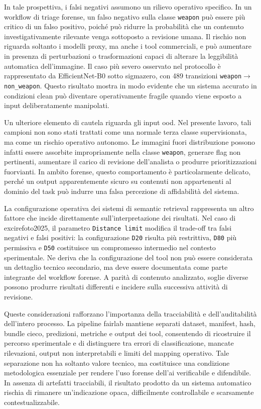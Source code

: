 In tale prospettiva, i falsi negativi assumono un rilievo operativo specifico.
In un workflow di triage forense, un falso negativo sulla classe
\texttt{weapon} può essere più critico di un falso positivo, poiché può ridurre
la probabilità che un contenuto investigativamente rilevante venga sottoposto a
revisione umana. Il rischio non riguarda soltanto i modelli proxy, ma anche i
tool commerciali, e può aumentare in presenza di perturbazioni o trasformazioni
capaci di alterare la leggibilità automatica dell'immagine. Il caso più severo
osservato nel protocollo è rappresentato da EfficientNet-B0 sotto
\gls{sigmazero}, con 489 transizioni
\texttt{weapon}\(\rightarrow\)\texttt{non\_weapon}. Questo risultato mostra in
modo evidente che un sistema accurato in condizioni clean può diventare
operativamente fragile quando viene esposto a input deliberatamente manipolati.

Un ulteriore elemento di cautela riguarda gli input \gls{ood}. Nel presente
lavoro, tali campioni non sono stati trattati come una normale terza classe
supervisionata, ma come un rischio operativo autonomo. Le immagini fuori
distribuzione possono infatti essere assorbite impropriamente nella classe
\texttt{weapon}, generare flag non pertinenti, aumentare il carico di revisione
dell'analista o produrre prioritizzazioni fuorvianti. In ambito forense, questo
comportamento è particolarmente delicato, perché un output apparentemente sicuro
su contenuti non appartenenti al dominio del task può indurre una falsa
percezione di affidabilità del sistema.

La configurazione operativa dei sistemi di semantic retrieval rappresenta un
altro fattore che incide direttamente sull'interpretazione dei risultati. Nel
caso di \gls{excirefoto2025}, il parametro \texttt{Distance limit} modifica il
trade-off tra falsi negativi e falsi positivi: la configurazione \texttt{D20}
risulta più restrittiva, \texttt{D80} più permissiva e \texttt{D50} costituisce
un compromesso intermedio nel contesto sperimentale. Ne deriva che la
configurazione del tool non può essere considerata un dettaglio tecnico
secondario, ma deve essere documentata come parte integrante del workflow
forense. A parità di contenuto analizzato, soglie diverse possono produrre
risultati differenti e incidere sulla successiva attività di revisione.

Queste considerazioni rafforzano l'importanza della tracciabilità e
dell'auditabilità dell'intero processo. La pipeline \gls{fairlab} mantiene
separati dataset, manifest, hash, bundle cieco, predizioni, metriche e output dei
tool, consentendo di ricostruire il percorso sperimentale e di distinguere tra
errori di classificazione, mancate rilevazioni, output non interpretabili e
limiti del mapping operativo. Tale separazione non ha soltanto valore tecnico,
ma costituisce una condizione metodologica essenziale per rendere l'uso forense
dell'\gls{ai} verificabile e difendibile. In assenza di artefatti tracciabili, il
risultato prodotto da un sistema automatico rischia di rimanere un'indicazione
opaca, difficilmente controllabile e scarsamente contestualizzabile.

